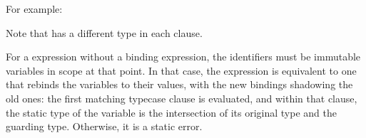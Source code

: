 
For example:

Note that  has a different type in each clause.

For a  expression without a binding expression,
the identifiers must be immutable variables in scope at that point.
In that case, the  expression is equivalent to one
that rebinds the variables to their values,
with the new bindings shadowing the old ones:
the first matching typecase clause is evaluated,
and within that clause, the static type of the variable
is the intersection of its original type and the guarding type.
Otherwise, it is a static error.

